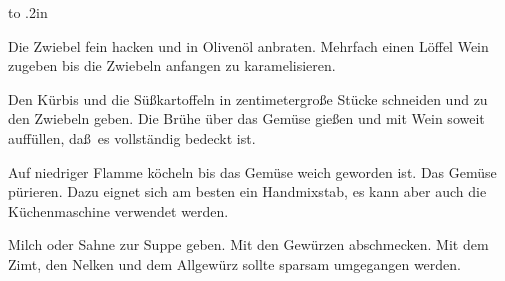 \documentclass[12pt,twocolumn,a4paper]{article}
\begin{document}
\leavevmode\vbox to .2in{\vss}

Die Zwiebel fein hacken und in Oliven\"ol anbraten. Mehrfach einen
L\"offel Wein zugeben bis die Zwiebeln anfangen zu karamelisieren.

Den K\"urbis und die S\"u\ss kartoffeln in zentimetergro\ss e St\"ucke 
schneiden und zu den Zwiebeln geben. Die Br\"uhe \"uber das Gem\"use
gie\ss en und mit Wein soweit auff\"ullen, da\ss\ es vollst\"andig
bedeckt ist.

Auf niedriger Flamme k\"ocheln bis das Gem\"use \hbox{weich} geworden
ist. Das Gem\"use p\"urieren. Dazu eignet sich am besten ein
Handmixstab, es kann aber auch die K\"uchenmaschine verwendet werden.

Milch oder Sahne zur Suppe geben. Mit den Gew\"urzen abschmecken. Mit
dem Zimt, den Nelken und dem Allgew\"urz sollte sparsam umgegangen
werden.
\end{document}
